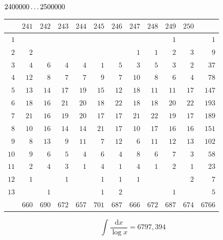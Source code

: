 \clearpage
\noindent\begin{minipage}{\linewidth}\centering
{}
\(2400000\mathinner{.\,.\,.}2500000\)\par\smallskip
\begingroup\fontsize{10.5}{11.5}\selectfont\setlength{\tabcolsep}{3.5pt}\renewcommand{\arraystretch}{1}
\begin{tabular}{r|rrrrrrrrrr|r}\hline
 & $241$ & $242$ & $243$ & $244$ & $245$ & $246$ & $247$ & $248$ & $249$ & $250$ &  \\ \hline
$1$ &  &  &  &  &  &  &  &  & $1$ &  & $1$ \\
$2$ & $2$ &  &  &  &  &  & $1$ & $1$ & $2$ & $3$ & $9$ \\
$3$ & $4$ & $6$ & $4$ & $4$ & $1$ & $5$ & $3$ & $5$ & $3$ & $2$ & $37$ \\
$4$ & $12$ & $8$ & $7$ & $7$ & $9$ & $7$ & $10$ & $8$ & $6$ & $4$ & $78$ \\
$5$ & $13$ & $14$ & $17$ & $19$ & $15$ & $12$ & $18$ & $11$ & $11$ & $17$ & $147$ \\
$6$ & $18$ & $16$ & $21$ & $20$ & $18$ & $22$ & $18$ & $18$ & $20$ & $22$ & $193$ \\
$7$ & $21$ & $16$ & $19$ & $20$ & $17$ & $17$ & $21$ & $22$ & $19$ & $17$ & $189$ \\
$8$ & $10$ & $16$ & $14$ & $14$ & $21$ & $17$ & $10$ & $17$ & $16$ & $16$ & $151$ \\
$9$ & $8$ & $13$ & $9$ & $11$ & $7$ & $12$ & $6$ & $11$ & $12$ & $13$ & $102$ \\
$10$ & $9$ & $6$ & $5$ & $4$ & $6$ & $4$ & $8$ & $6$ & $7$ & $3$ & $58$ \\
$11$ & $2$ & $4$ & $3$ & $1$ & $4$ & $1$ & $4$ & $1$ & $2$ & $1$ & $23$ \\
$12$ & $1$ &  & $1$ &  & $1$ & $1$ & $1$ &  &  & $2$ & $7$ \\
$13$ &  & $1$ &  &  & $1$ & $2$ &  &  & $1$ &  & $5$ \\
\hline
 & $660$ & $690$ & $672$ & $657$ & $701$ & $687$ & $666$ & $672$ & $687$ & $674$ & $6766$ \\ \hline
\end{tabular}\par\endgroup
\setlength{\abovedisplayskip}{6pt}\setlength{\belowdisplayskip}{4pt}
\[\int\frac{\mathrm{d}x}{\log x}=6797{,}394\]
\end{minipage}

